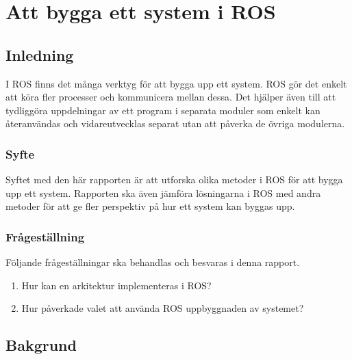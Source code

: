 \chapter{Att bygga ett system i ROS}
\label{cha:indiv-report-lundberg}

\section{Inledning}
\label{sec:introduction-lundberg}

I ROS finns det många verktyg för att bygga upp ett system. ROS gör det enkelt att köra fler processer och kommunicera mellan dessa. Det hjälper även till att tydliggöra uppdelningar av ett program i separata moduler som enkelt kan återanvändas och vidareutvecklas separat utan att påverka de övriga modulerna.


\subsection{Syfte}
\label{sec:purpose-lundberg}

Syftet med den här rapporten är att utforska olika metoder i ROS för att bygga upp ett system. Rapporten ska även jämföra lösningarna i ROS med andra metoder för att ge fler perspektiv på hur ett system kan byggas upp. 

\subsection{Frågeställning}
\label{sec:issue-lundberg}

Följande frågeställningar ska behandlas och besvaras i denna rapport.

\begin{enumerate}
	\item Hur kan en arkitektur implementeras i ROS?
	
	\item Hur påverkade valet att använda ROS uppbyggnaden av systemet?
\end{enumerate}


\section{Bakgrund}
\label{sec:background-lundberg}

